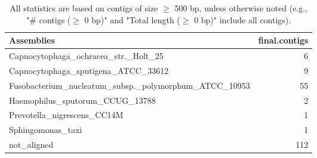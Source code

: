 \documentclass[12pt,a4paper]{article}
\begin{document}
\begin{table}[ht]
\begin{center}
\caption{All statistics are based on contigs of size $\geq$ 500 bp, unless otherwise noted (e.g., "\# contigs ($\geq$ 0 bp)" and "Total length ($\geq$ 0 bp)" include all contigs).}
\begin{tabular}{|l*{1}{|r}|}
\hline
Assemblies & final.contigs \\ \hline
Capnocytophaga\_ochracea\_str.\_Holt\_25 & 6 \\ \hline
Capnocytophaga\_sputigena\_ATCC\_33612 & 9 \\ \hline
Fusobacterium\_nucleatum\_subsp.\_polymorphum\_ATCC\_10953 & 55 \\ \hline
Haemophilus\_sputorum\_CCUG\_13788 & 2 \\ \hline
Prevotella\_nigrescens\_CC14M & 1 \\ \hline
Sphingomonas\_taxi & 1 \\ \hline
not\_aligned & 112 \\ \hline
\end{tabular}
\end{center}
\end{table}
\end{document}
